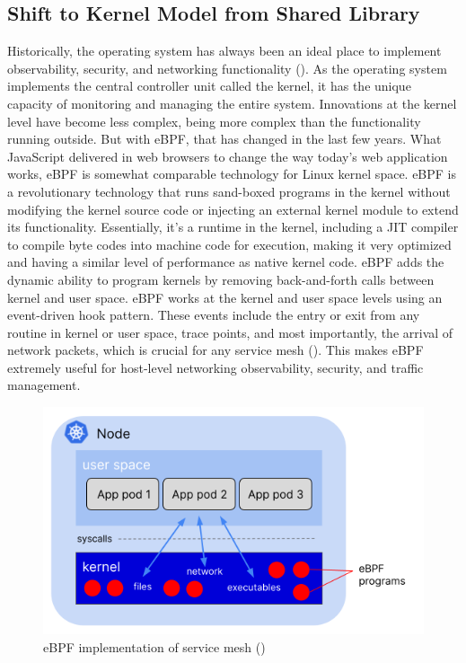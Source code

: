 \subsection{Shift to Kernel Model from Shared Library}
\label{lr:ebpf}
Historically, the operating system has always been an ideal place to implement observability, security, and networking functionality (\cite{ebpfIODocs}). As the operating system implements the central controller unit called the kernel, it has the unique capacity of monitoring and managing the entire system. Innovations at the kernel level have become less complex, being more complex than the functionality running outside. But with eBPF, that has changed in the last few years. What JavaScript delivered in web browsers to change the way today's web application works, eBPF is somewhat comparable technology for Linux kernel space. eBPF is a revolutionary technology that runs sand-boxed programs in the kernel without modifying the kernel source code or injecting an external kernel module to extend its functionality. Essentially, it's a runtime in the kernel, including a JIT compiler to compile byte codes into machine code for execution, making it very optimized and having a similar level of performance as native kernel code. eBPF adds the dynamic ability to program kernels by removing back-and-forth calls between kernel and user space. eBPF works at the kernel and user space levels using an event-driven hook pattern. These events include the entry or exit from any routine in kernel or user space, trace points, and most importantly, the arrival of network packets, which is crucial for any service mesh (\cite{thenewstackRice2021}). This makes eBPF extremely useful for host-level networking observability, security, and traffic management.

\begin{figure}[ht!]
  \centering
  \includegraphics[width=0.65\linewidth]{resources/ebpf-service-mesh.png}
  \caption{eBPF implementation of service mesh (\cite{thenewstackRice2021})}
  \label{lr:ebpfDesign}
 \end{figure}

